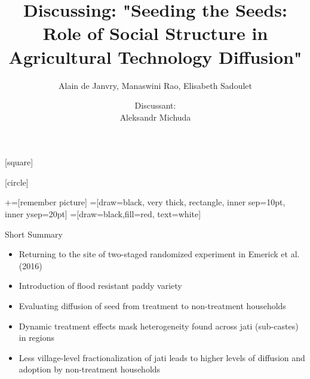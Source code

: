 \documentclass{beamer}
\title{Discussing: "Seeding the Seeds: Role of Social Structure in
Agricultural Technology Diffusion"}
\author[et al]{Alain de Janvry, Manaswini Rao, Elisabeth Sadoulet}
\date[November 2022] %
{Discussant:\\
Aleksandr Michuda}
\begin{document}
[square]


[circle]

\newcommand\marktopleft[1]{%
    \tikz[overlay,remember picture] 
        \node (marker-#1-a) at (-.3em,.3em) {};%
}
\newcommand\markbottomright[2]{%
    \tikz[overlay,remember picture] 
        \node (marker-#1-b) at (0em,0em) {};%
}
+=[remember picture] 
 =[draw=black, very thick, rectangle, inner sep=10pt, inner ysep=20pt]
 =[draw=black,fill=red, text=white]



\frame{\titlepage}





\begin{frame}{Short Summary}
    \begin{itemize}
        \item Returning to the site of two-staged randomized experiment in Emerick et al. (2016)
        \item Introduction of flood resistant paddy variety 
        \item Evaluating diffusion of seed from treatment to non-treatment households
        \item Dynamic treatment effects mask heterogeneity found across jati (sub-castes) in regions
        \item Less village-level fractionalization of jati leads to higher levels of diffusion and adoption by non-treatment households
    \end{itemize}
\end{frame}
\end{document}
